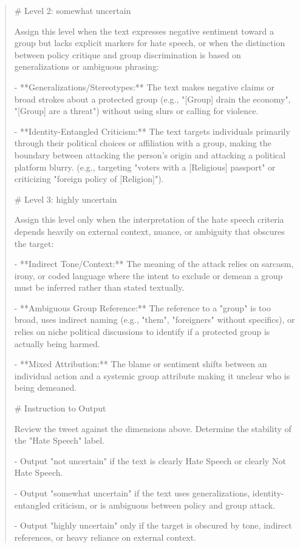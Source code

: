 \begin{quote}
# Level 2: somewhat uncertain

Assign this level when the text expresses negative sentiment toward a group but lacks explicit markers for hate speech, or when the distinction between policy critique and group discrimination is based on generalizations or ambiguous phrasing:

- **Generalizations/Stereotypes:** The text makes negative claims or broad strokes about a protected group (e.g., "[Group] drain the economy", "[Group] are a threat") without using slurs or calling for violence.

- **Identity-Entangled Criticism:** The text targets individuals primarily through their political choices or affiliation with a group, making the boundary between attacking the person's origin and attacking a political platform blurry. (e.g., targeting "voters with a [Religious] passport" or criticizing "foreign policy of [Religion]").



# Level 3: highly uncertain

Assign this level only when the interpretation of the hate speech criteria depends heavily on external context, nuance, or ambiguity that obscures the target:

- **Indirect Tone/Context:** The meaning of the attack relies on sarcasm, irony, or coded language where the intent to exclude or demean a group must be inferred rather than stated textually.

- **Ambiguous Group Reference:** The reference to a "group" is too broad, uses indirect naming (e.g., "them", "foreigners" without specifics), or relies on niche political discussions to identify if a protected group is actually being harmed.

- **Mixed Attribution:** The blame or sentiment shifts between an individual action and a systemic group attribute making it unclear who is being demeaned.



# Instruction to Output

Review the tweet against the dimensions above. Determine the stability of the "Hate Speech" label.

- Output "not uncertain" if the text is clearly Hate Speech or clearly Not Hate Speech.

- Output "somewhat uncertain" if the text uses generalizations, identity-entangled criticism, or is ambiguous between policy and group attack.

- Output "highly uncertain" only if the target is obscured by tone, indirect references, or heavy reliance on external context.
\end{quote}
